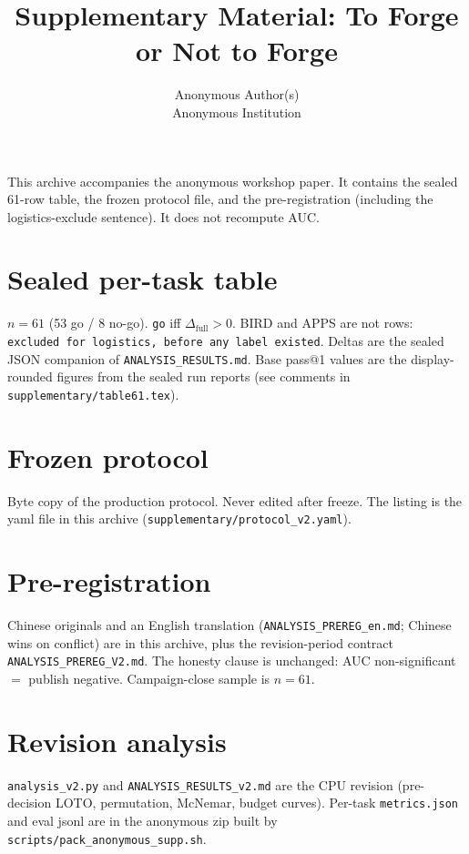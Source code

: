 \documentclass{article}
\title{Supplementary Material: To Forge or Not to Forge}
\author{%
  Anonymous Author(s) \\
  Anonymous Institution \\
}
\begin{document}
\maketitle

\noindent This archive accompanies the anonymous workshop paper.
It contains the sealed 61-row table, the frozen protocol file, and
the pre-registration (including the logistics-exclude sentence).
It does not recompute AUC.

\section{Sealed per-task table}
$n{=}61$ (53 go / 8 no-go).
\texttt{go} iff $\Delta_{\mathrm{full}}>0$.
BIRD and APPS are not rows:
\texttt{excluded for logistics, before any label existed}.
Deltas are the sealed JSON companion of
\texttt{ANALYSIS\_RESULTS.md}. Base pass@1 values are the
display-rounded figures from the sealed run reports (see comments
in \texttt{supplementary/table61.tex}).



\section{Frozen protocol}
Byte copy of the production protocol. Never edited after freeze.
The listing is the yaml file in this archive
(\texttt{supplementary/protocol\_v2.yaml}).

\section{Pre-registration}
Chinese originals and an English translation
(\texttt{ANALYSIS\_PREREG\_en.md}; Chinese wins on conflict)
are in this archive, plus the revision-period contract
\texttt{ANALYSIS\_PREREG\_V2.md}.
The honesty clause is unchanged: AUC non-significant $=$ publish
negative. Campaign-close sample is $n{=}61$.

\section{Revision analysis}
\texttt{analysis\_v2.py} and \texttt{ANALYSIS\_RESULTS\_v2.md}
are the CPU revision (pre-decision LOTO, permutation, McNemar,
budget curves). Per-task \texttt{metrics.json} and eval jsonl
are in the anonymous zip built by
\texttt{scripts/pack\_anonymous\_supp.sh}.
\end{document}
